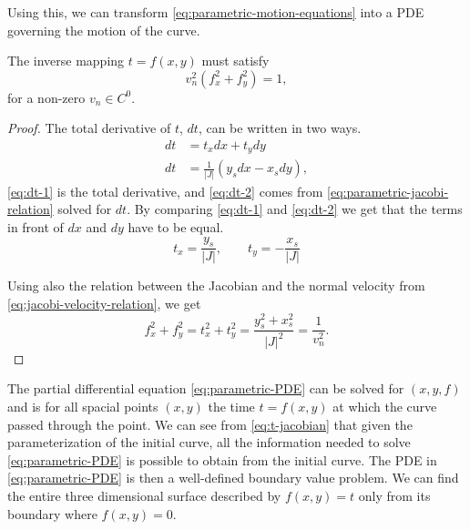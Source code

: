 Using this, we can transform \eqref{eq:parametric-motion-equations} into a PDE governing the motion of the curve.
\begin{proposition}
    The inverse mapping $t=f(x, y)$ must satisfy 
    \begin{equation}
        v_n^2(f_x^2 + f_y^2) = 1,
        \label{eq:parametric-PDE}
    \end{equation}
    for a non-zero $v_n\in C^0$.
    \label{prop:parametric-PDE}
\end{proposition}
\begin{proof}
The total derivative of $t$, $dt$, can be written in two ways. 
\begin{align}
    dt &= t_x dx + t_y dy  \label{eq:dt-1}\\
    dt &= \frac{1}{|J|}(y_s dx - x_s dy) \label{eq:dt-2},
\end{align}
\eqref{eq:dt-1} is the total derivative, and \eqref{eq:dt-2} comes from \eqref{eq:parametric-jacobi-relation} solved for $dt$. By comparing \eqref{eq:dt-1} and \eqref{eq:dt-2} we get that the terms in front of $dx$ and $dy$ have to be equal. 
\begin{equation}
    t_x = \frac{y_s}{|J|}, \qquad t_y = -\frac{x_s}{|J|}
    \label{eq:t-jacobian}
\end{equation}

Using also the relation between the Jacobian and the normal velocity from \eqref{eq:jacobi-velocity-relation}, we get
\begin{equation*}
    f_x^2+f_y^2 = t_x^2+t_y^2 = \frac{y_s^2 + x_s^2}{|J|^2} = \frac{1}{v_n^2}.
\end{equation*}
\end{proof}

The partial differential equation \eqref{eq:parametric-PDE} can be solved for $(x, y, f)$ and is for all spacial points $(x, y)$ the time $t = f(x, y)$ at which the curve passed through the point. We can see from \eqref{eq:t-jacobian} that given the parameterization of the initial curve, all the information needed to solve \eqref{eq:parametric-PDE} is possible to obtain from the initial curve. The PDE in \eqref{eq:parametric-PDE} is then a well-defined boundary value problem. We can find the entire three dimensional surface described by $f(x, y)=t$ only from its boundary where $f(x, y)=0$.

